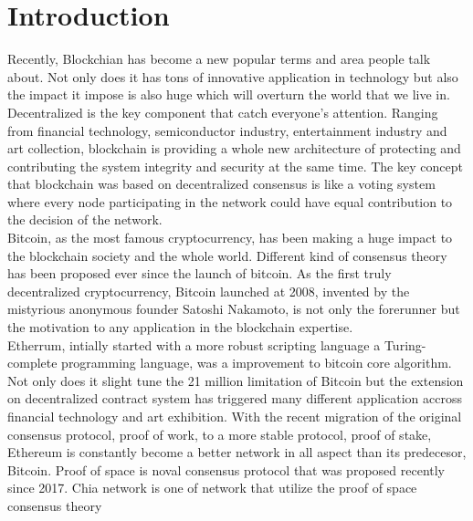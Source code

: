 \documentclass[sigconf, nonacm, natbib=false]{acmart}
\begin{document}
\section{Introduction}
Recently, Blockchian has become a new popular terms and area people talk about. Not only does it has tons of innovative application in technology but also the impact it impose is also huge which will overturn the world that we live in. Decentralized is the key component that catch everyone's attention. Ranging from financial technology, semiconductor industry, entertainment industry and art collection, blockchain is providing a whole new architecture of protecting and contributing the system integrity and security at the same time. The key concept that blockchain was based on decentralized consensus is like a voting system where every node participating in the network could have equal contribution to the decision of the network. \\
Bitcoin, as the most famous cryptocurrency, has been making a huge impact to the blockchain society and the whole world. Different kind of consensus theory has been proposed ever since the launch of bitcoin. As the first truly decentralized cryptocurrency, Bitcoin launched at 2008, invented by the mistyrious anonymous founder Satoshi Nakamoto, is not only the forerunner but the motivation to any application in the blockchain expertise. \\
Etherrum, intially started with a more robust scripting language a Turing-complete programming language, was a improvement to bitcoin core algorithm. Not only does it slight tune the 21 million limitation of Bitcoin but the extension on decentralized contract system has triggered many different application accross financial technology and art exhibition. With the recent migration of the original consensus protocol, proof of work, to a more stable protocol, proof of stake, Ethereum is constantly become a better network in all aspect than its predecesor, Bitcoin. 
Proof of space is noval consensus protocol that was proposed recently since 2017. Chia network is one of network that utilize the proof of space consensus theory  \\


\end{document}
